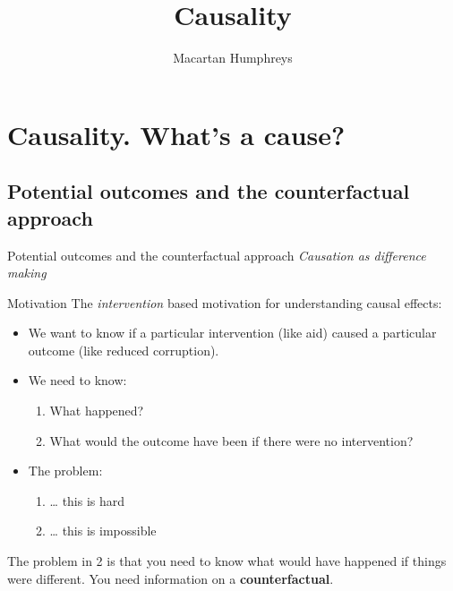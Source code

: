 \documentclass[
  11pt,
  ignorenonframetext,
]{beamer}
\title{Causality}
\author{Macartan Humphreys}
\date{}
\providecommand{\tightlist}{%
  \setlength{\itemsep}{0pt}\setlength{\parskip}{0pt}}\usepackage{longtable,booktabs,array}
\begin{document}
\frame{\titlepage}
\ifdefined\Shaded\renewenvironment{Shaded}{\begin{tcolorbox}[breakable, sharp corners, frame hidden, interior hidden, boxrule=0pt, borderline west={3pt}{0pt}{shadecolor}, enhanced]}{\end{tcolorbox}}\fi

\hypertarget{seccausality}{%
\section{Causality. What's a cause?}\label{seccausality}}

\hypertarget{potential-outcomes-and-the-counterfactual-approach}{%
\subsection{Potential outcomes and the counterfactual
approach}\label{potential-outcomes-and-the-counterfactual-approach}}

\begin{frame}{Potential outcomes and the counterfactual approach}
\emph{Causation as difference making}
\end{frame}

\begin{frame}{Motivation \label{po}}
\protect\hypertarget{motivation}{}
The \emph{intervention} based motivation for understanding causal
effects:

\begin{itemize}
\tightlist
\item
  We want to know if a particular intervention (like aid) caused a
  particular outcome (like reduced corruption).
\item
  We need to know:

  \begin{enumerate}
  \tightlist
  \item
    What happened?
  \item
    What would the outcome have been if there were no intervention?
  \end{enumerate}
\item
  The problem:

  \begin{enumerate}
  \tightlist
  \item
    \ldots{} this is hard
  \item
    \ldots{} this is impossible
  \end{enumerate}
\end{itemize}

The problem in 2 is that you need to know what would have happened if
things were different. You need information on a
\textbf{counterfactual}.
\end{frame}
\end{document}
